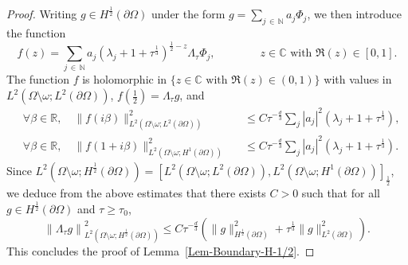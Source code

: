 \documentclass[10pt]{amsart}
\theoremstyle{definition}\newtheorem{defi}[theo]{Definition}\newtheorem{rema}[theo]{Remark}\newtheorem{exam}[theo]{Example}\newtheorem{exem}[theo]{Example}\newtheorem{nota}[theo]{Notation}
\newcommand*\R{\mathbb{R}}
\newcommand*\N{\mathbb{N}}
\newcommand*\C{\mathbb{C}}
\newcommand*\ds{\displaystyle}
\renewcommand{\leq}{\leqslant}
\renewcommand{\geq}{\geqslant}
\let\oldforall\forall
\renewcommand*{\forall}{\mathrel{\oldforall}}
\begin{document}
\begin{proof}
Writing $g \in H^{\frac{1}{2}}(\partial \Omega)$ under the form $g = \sum_{j\,\in\,\N} a_j \Phi_j$, we then introduce the function
\[
f(z) = \sum_{j\,\in\,\N} a_j (\lambda_j +1 + \tau^{\frac{1}{3}})^{\frac{1}{2} - z} \Lambda_\tau \Phi_j,
\qquad \qquad z \in \C \text{ with } \Re(z) \in [0,1].
\]
The function $f$ is holomorphic in $\{z \in \C \text{ with } \Re(z) \in (0,1)\}$ with values in $L^2(\Omega \setminus\omega; L^2(\partial \Omega))$, $f(\frac{1}{2}) = \Lambda_\tau g$, and
\begin{align*}
& \forall \beta \in \R,\quad
\ds \| f(i \beta) \|_{L^2\left(\Omega \setminus\omega; L^2(\partial \Omega)\right)}^2 &&\leq C \tau^{-\frac{d}{3}} \sum_{j} |a_j|^2 \left(\lambda_j + 1+ \tau^{\frac{1}{3}}\right),
\\
& \forall \beta \in \R,\quad
\ds\| f(1+ i \beta) \|_{L^2\left(\Omega \setminus\omega; H^1(\partial \Omega)\right)}^2
&&\leq C \tau^{-\frac{d}{3}}
\sum_{j} |a_j|^2 \left(\lambda_j + 1+ \tau^{\frac{1}{3}}\right).
\end{align*}
Since $L^2(\Omega \setminus\omega; H^{\frac{1}{2}}(\partial \Omega)) = [L^2(\Omega \setminus\omega; L^2(\partial \Omega)), L^2(\Omega \setminus\omega; H^1(\partial \Omega))]_{\frac{1}{2}}$, we deduce from the above estimates that there exists $C>0$ such that for all $g \in H^{\frac{1}{2}}(\partial \Omega)$ and $\tau \geq \tau_0$,
\[
\left\| \Lambda_\tau g\right\|_{L^2\left(\Omega \setminus\omega; H^{\frac{1}{2}}(\partial \Omega)\right) }^2
\leq C \tau^{-\frac{d}{3}} \left(\| g \|_{H^{\frac{1}{2}}(\partial \Omega)}^2 + \tau^{\frac{1}{3}} \| g \|_{L^2(\partial \Omega)}^2\right).
\]
This concludes the proof of Lemma~\ref{Lem-Boundary-H-1/2}.
\end{proof}

\vspace*{45pt}


\end{document}
